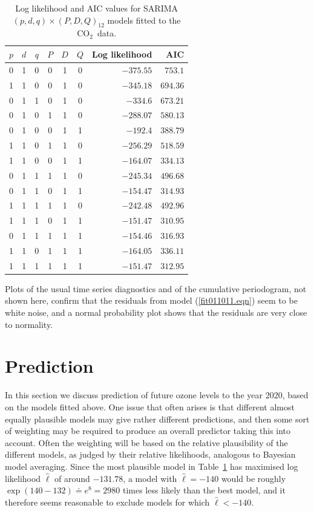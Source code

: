 \documentclass[a4paper,11pt]{article}\usepackage[]{graphicx}\usepackage[]{color}
\def\CO{{CO$_{2}$}}
\begin{document}


\begin{table}[ht!]
\begin{center}
\begin{tabular}{ccccccrr}
\toprule
$p$& $d$& $q$& $P$& $D$& $Q$& Log likelihood& AIC\\
\midrule
0&1&0&0&1&0&$-375.55$&$753.1$\\
1&1&0&0&1&0&$-345.18$&$694.36$\\
0&1&1&0&1&0&$-334.6$&$673.21$\\
0&1&0&1&1&0&$-288.07$&$580.13$\\
0&1&0&0&1&1&$-192.4$&$388.79$\\
1&1&0&1&1&0&$-256.29$&$518.59$\\
1&1&0&0&1&1&$-164.07$&$334.13$\\
0&1&1&1&1&0&$-245.34$&$496.68$\\
0&1&1&0&1&1&$-154.47$&$314.93$\\
1&1&1&1&1&0&$-242.48$&$492.96$\\
1&1&1&0&1&1&$-151.47$&$310.95$\\
0&1&1&1&1&1&$-154.46$&$316.93$\\
1&1&0&1&1&1&$-164.05$&$336.11$\\
1&1&1&1&1&1&$-151.47$&$312.95$\\
\bottomrule
\end{tabular}
\end{center}
\caption{Log likelihood and AIC values for  SARIMA $(p,d,q)\times(P,D,Q)_{12}$ models fitted to the \CO\  data.}
\label{AIC.table}
\end{table}

Plots of the usual time series diagnostics and of the cumulative periodogram, not shown here, confirm that the residuals from model (\ref{fit011011.eqn}) seem to be white noise, and a normal probability plot shows that the residuals are very close to normality.  



\section{Prediction}

In this section we discuss prediction of future ozone levels to the year 2020, based on the models fitted above.   One issue that often arises is that different almost equally plausible models may give rather different predictions, and then some sort of weighting may be required to produce an overall predictor taking this into account.  Often the weighting will be based on the relative plausibility of the different models, as judged by their relative likelihoods, analogous to Bayesian model averaging. Since the most plausible model in Table~\ref{AIC.table} has maximised log likelihood $\hat\ell$ of around $-131.78$, a model with $\hat\ell=-140$ would be roughly $\exp(140-132) \doteq e^8 = 2980$ times less likely than the best model, and it therefore seems reasonable to exclude models for which $\hat\ell<-140$. 
\end{document}
